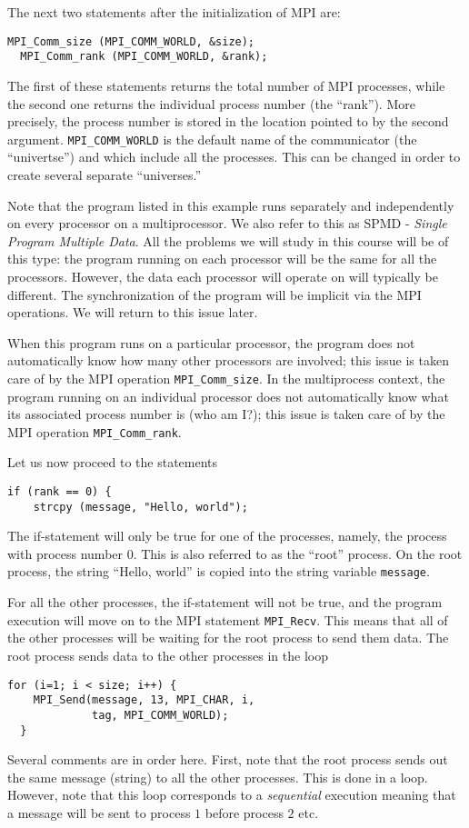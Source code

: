 The next two statements after the initialization of MPI are:
\begin{lstlisting}[style=c]
  MPI_Comm_size (MPI_COMM_WORLD, &size);
  MPI_Comm_rank (MPI_COMM_WORLD, &rank);
\end{lstlisting}
The first of these statements returns the total number of MPI processes, while
the second one returns the individual process number (the ``rank''). More
precisely, the process number is stored in the location pointed to by the second
argument. \texttt{MPI\_COMM\_WORLD} is the default name of the communicator (the
``univertse'') and which include all the processes. This can be changed in order
to create several separate ``universes.''

Note that the program listed in this example runs separately and independently
on every processor on a multiprocessor. We also refer to this as SPMD -
\emph{Single Program Multiple Data}. All the problems we will study in this
course will be of this type: the program running on each processor will be the
same for all the processors. However, the data each processor will operate on
will typically be different. The synchronization of the program will be implicit
via the MPI operations. We will return to this issue later.

When this program runs on a particular processor, the program does not
automatically know how many other processors are involved; this issue is taken
care of by the MPI operation \texttt{MPI\_Comm\_size}. In the multiprocess
context, the program running on an individual processor does not automatically
know what its associated process number is (who am I?); this issue is taken care
of by the MPI operation \texttt{MPI\_Comm\_rank}.

Let us now proceed to the statements
\begin{lstlisting}[style=c]
  if (rank == 0) {
    strcpy (message, "Hello, world");
\end{lstlisting}
The if-statement will only be true for one of the processes, namely, the process
with process number 0. This is also referred to as the ``root'' process. On the
root process, the string ``Hello, world'' is copied into the string variable
\texttt{message}.

For all the other processes, the if-statement will not be true, and the program
execution will move on to the MPI statement \texttt{MPI\_Recv}. This means that
all of the other processes will be waiting for the root process to send them
data. The root process sends data to the other processes in the loop
\begin{lstlisting}[style=c]
  for (i=1; i < size; i++) {
    MPI_Send(message, 13, MPI_CHAR, i,
             tag, MPI_COMM_WORLD);
  }
\end{lstlisting}
Several comments are in order here. First, note that the root process sends out
the same message (string) to all the other processes. This is done in a loop.
However, note that this loop corresponds to a \emph{sequential} execution
meaning that a message will be sent to process $1$ before process $2$ etc.

